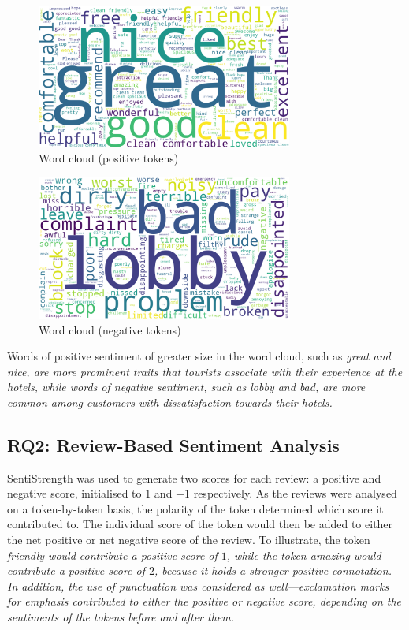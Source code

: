 \documentclass[12pt,bibliography=totocnumbered]{scrartcl}
\begin{document}
{\begin{figure}[htpb]
	\begin{center}
		\includegraphics[width=0.75\textwidth]{../results/rq1/wordcloud_pos.png}
	\end{center}
	\caption{Word cloud (positive tokens)}
	\label{fig:wordcloud-pos}
\end{figure}

\begin{figure}[htpb]
	\begin{center}
		\includegraphics[width=0.75\textwidth]{../results/rq1/wordcloud_neg.png}
	\end{center}
	\caption{Word cloud (negative tokens)}
	\label{fig:wordcloud-neg}
\end{figure}

Words of positive sentiment of greater size in the word cloud,
such as \it{great} and \it{nice}, are more prominent traits that tourists associate
with their experience at the hotels, while words of negative sentiment, such as \it{lobby}
and \it{bad}, are more common among customers with dissatisfaction towards their hotels.

\subsection{RQ2: Review-Based Sentiment Analysis}
SentiStrength was used to generate two scores for each review: a positive and
negative score, initialised to $1$ and $-1$ respectively. As the reviews were analysed
on a token-by-token basis, the polarity of the token determined which score it contributed
to. The individual score of the token would then be added to either the net positive or
net negative score of the review. To illustrate, the token \it{friendly} would contribute
a positive score of $1$, while the token \it{amazing} would contribute a positive score of $2$,
because it holds a stronger positive connotation. In addition, the use of punctuation was
considered as well---exclamation marks for emphasis contributed to either the positive or
negative score, depending on the sentiments of the tokens before and after them.

}
\end{document}
